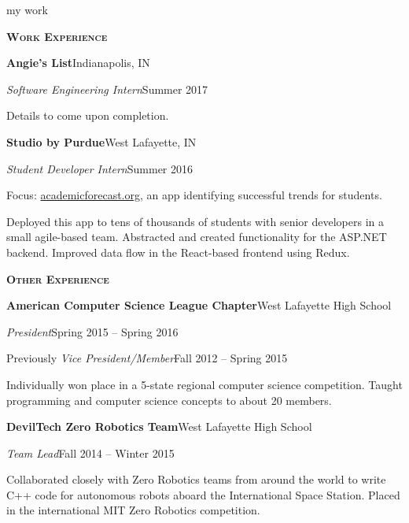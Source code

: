\documentclass[11pt]{article}
\newcommand{\sectionfont}{\Large\scshape\bfseries\color{cg505green}}
\newcommand{\impact}[1]{\textcolor{cg505green}{\nohyphens{#1}}}
\begin{document}
\begin{minipage}[t]{0.67\textwidth}
  {\Huge\color{black} my work \phantom{me}}

  \vspace{5pt}

  {\sectionfont Work Experience}

  \textbf{Angie's List}\hfill Indianapolis, IN
  \begin{adjustwidth}{10pt}{}
    \emph{Software Engineering Intern}\hfill Summer 2017

    Details to come upon completion.
  \end{adjustwidth}

  \textbf{Studio by Purdue}\hfill West Lafayette, IN
  \begin{adjustwidth}{10pt}{}
    \emph{Student Developer Intern}\hfill Summer 2016

    Focus: \href{https://academicforecast.org/about/}{academicforecast.org}, an app identifying successful trends for students.

    \impact{Deployed this app to tens of thousands} of students with senior developers in a small agile-based team.
    Abstracted and created functionality for the ASP.NET backend.
    Improved data flow in the React-based frontend using Redux.
  \end{adjustwidth}

  \vspace{5pt}

  {\sectionfont Other Experience}

  \textbf{American Computer Science League Chapter}\hfill West Lafayette High School
  \begin{adjustwidth}{10pt}{}
    \emph{President}\hfill Spring 2015 -- Spring 2016

    Previously \emph{Vice President/Member}\hfill Fall 2012 -- Spring 2015

    Individually \impact{won  place} in a 5-state regional computer science competition.
    Taught programming and computer science concepts to about 20 members.
  \end{adjustwidth}

  \textbf{DevilTech Zero Robotics Team}\hfill West Lafayette High School
  \begin{adjustwidth}{10pt}{}
    \emph{Team Lead}\hfill Fall 2014 -- Winter 2015

    Collaborated closely with Zero Robotics teams from \impact{around the world} to write C++ code for autonomous robots aboard the International Space Station.
    \impact{Placed } in the international MIT Zero Robotics competition.
  \end{adjustwidth}


\end{minipage}
\end{document}
